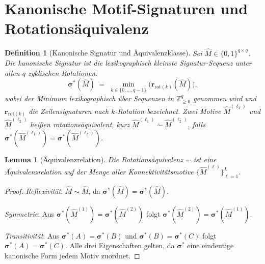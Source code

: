 ﻿\documentclass[12pt, a4paper, openany]{report}
\newtheorem{lemma}[theorem]{Lemma}
\newtheorem{definition}[theorem]{Definition}
\newcommand{\Z}{\mathbb{Z}}
\begin{document}
\section{Kanonische Motif-Signaturen und Rotationsäquivalenz}
\label{sec:sgkr_signature}

\begin{definition}[Kanonische Signatur und Äquivalenzklasse]
\label{def:canonical_sig}
Sei $\hat{M} \in \{0,1\}^{q\times q}$.  Die \emph{kanonische Signatur} ist
die lexikographisch kleinste Signatur-Sequenz unter allen $q$ zyklischen
Rotationen:
\begin{equation}
  \label{eq:canonical}
  \bm{\sigma}^*(\hat{M})
  \;=\; \min_{k \in \{0,\ldots,q-1\}}
  \bigl(\bm{r}_{\mathrm{rot}(k)}(\hat{M})\bigr),
\end{equation}
wobei der Minimum lexikographisch über Sequenzen in $\Z_{\geq 0}^q$
genommen wird und $\bm{r}_{\mathrm{rot}(k)}$ die Zeilensignaturen nach
$k$-Rotation bezeichnet.
Zwei Motive $\hat{M}^{(\ell_1)}$ und $\hat{M}^{(\ell_2)}$ heißen
\emph{rotations\-äquivalent}, kurz $\hat{M}^{(\ell_1)} \sim \hat{M}^{(\ell_2)}$,
falls $\bm{\sigma}^*(\hat{M}^{(\ell_1)}) = \bm{\sigma}^*(\hat{M}^{(\ell_2)})$.
\end{definition}

\begin{lemma}[Äquivalenzrelation]
\label{lem:equiv_relation}
Die Rotationsäquivalenz $\sim$ ist eine Äquivalenzrelation auf der Menge
aller Konnektivitätsmotive $\{\hat{M}^{(\ell)}\}_{\ell=1}^{L}$.
\end{lemma}

\begin{proof}
\emph{Reflexivität}: $\hat{M} \sim \hat{M}$, da $\bm{\sigma}^*(\hat{M}) = \bm{\sigma}^*(\hat{M})$.

\emph{Symmetrie}: Aus $\bm{\sigma}^*(\hat{M}^{(1)}) = \bm{\sigma}^*(\hat{M}^{(2)})$
folgt $\bm{\sigma}^*(\hat{M}^{(2)}) = \bm{\sigma}^*(\hat{M}^{(1)})$.

\emph{Transitivität}: Aus $\bm{\sigma}^*(A) = \bm{\sigma}^*(B)$ und
$\bm{\sigma}^*(B) = \bm{\sigma}^*(C)$ folgt $\bm{\sigma}^*(A) = \bm{\sigma}^*(C)$.
Alle drei Eigenschaften gelten, da $\bm{\sigma}^*$ eine eindeutige
kanonische Form jedem Motiv zuordnet.
\end{proof}
\end{document}
